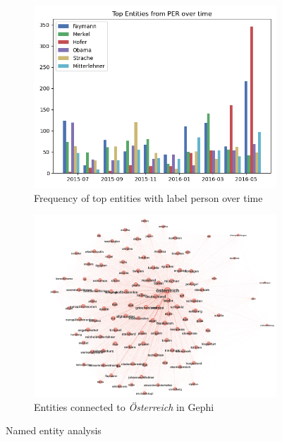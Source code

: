 \documentclass[acmsmall]{acmart}
\begin{document}
\begin{figure}[H]
\centering
\begin{subfigure}{.5\textwidth}
\centering
  \includegraphics[width=.9\linewidth]{assets/Top_Entities_from_PER_over_time.png} 
  \caption{Frequency of top entities with label person over time}
  \label{fig:per_entities_over_time}
 \end{subfigure}%
\begin{subfigure}{.5\textwidth}
\centering
  \includegraphics[width=.9\linewidth]{assets/co_occurrences_oesterreich.png}
  \caption{Entities connected to \textit{\"Osterreich} in Gephi}
  \label{fig:graph_cooccurrences_oesterreich}
 \end{subfigure}
 \caption{Named entity analysis}
\label{fig:ne_analysis}
\end{figure}



\pagebreak



\end{document}
